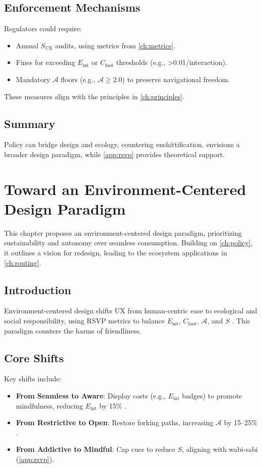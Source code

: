 \documentclass[openany]{book}
\newcommand{\Sent}{S} %
\newcommand{\Eint}{E_{\mathrm{int}}} %
\newcommand{\Cfoot}{C_{\mathrm{foot}}} %
\newcommand{\Auton}{\mathcal{A}} %
\newcommand{\SUX}{S_{\mathrm{UX}}} %
\newcommand{\kWh}{\mathrm{kWh}}
\begin{document}
\section{Enforcement Mechanisms}
\label{sec:policy-enforce}
Regulators could require:
\begin{itemize}
  \item Annual $\SUX$ audits, using metrics from \cref{ch:metrics}.
  \item Fines for exceeding $\Eint$ or $\Cfoot$ thresholds (e.g., \SI{>0.01}{\kWh}/interaction).
  \item Mandatory $\Auton$ floors (e.g., $\Auton \geq 2.0$) to preserve navigational freedom.
\end{itemize}
These measures align with the principles in \cref{ch:principles}.

\section{Summary}
Policy can bridge design and ecology, countering enshittification.  envisions a broader design paradigm, while \cref{app:rsvp} provides theoretical support.

\chapter{Toward an Environment-Centered Design Paradigm}
\label{ch:paradigm}

This chapter proposes an environment-centered design paradigm, prioritizing sustainability and autonomy over seamless consumption. Building on \cref{ch:policy}, it outlines a vision for redesign, leading to the ecosystem applications in \cref{ch:routing}.

\section{Introduction}
\label{sec:paradigm-intro}
Environment-centered design shifts UX from human-centric ease to ecological and social responsibility, using RSVP metrics to balance $\Eint$, $\Cfoot$, $\Auton$, and $\Sent$ \citep{colak2024,doctorow2022}. This paradigm counters the harms of friendliness.

\section{Core Shifts}
\label{sec:paradigm-shifts}
Key shifts include:
\begin{itemize}
  \item \textbf{From Seamless to Aware}: Display costs (e.g., $\Eint$ badges) to promote mindfulness, reducing $\Eint$ by 15\% \citep{colak2024}.
  \item \textbf{From Restrictive to Open}: Restore forking paths, increasing $\Auton$ by 15--25\% \citep{doctorow2022}.
  \item \textbf{From Addictive to Mindful}: Cap cues to reduce $\Sent$, aligning with wabi-sabi (\cref{app:rsvp}).
\end{itemize}
\end{document}
